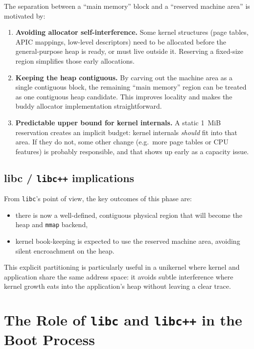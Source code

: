 \documentclass[a4paper,11pt]{article}
\begin{document}
The separation between a “main memory” block and a “reserved machine
area” is motivated by:

\begin{enumerate}
  \item \textbf{Avoiding allocator self-interference.}  
    Some kernel structures (page tables, APIC mappings, low-level
    descriptors) need to be allocated before the general-purpose heap is
    ready, or must live outside it. Reserving a fixed-size region
    simplifies those early allocations.

  \item \textbf{Keeping the heap contiguous.}  
    By carving out the machine area as a single contiguous block, the
    remaining “main memory” region can be treated as one contiguous heap
    candidate. This improves locality and makes the buddy allocator
    implementation straightforward.

  \item \textbf{Predictable upper bound for kernel internals.}  
    A static 1~MiB reservation creates an implicit budget: kernel
    internals \emph{should} fit into that area. If they do not, some
    other change (e.g.\ more page tables or CPU features) is probably
    responsible, and that shows up early as a capacity issue.
\end{enumerate}

\subsection{libc / \texorpdfstring{\texttt{libc++}}{libc++} implications}

From \texttt{libc}'s point of view, the key outcomes of this phase are:

\begin{itemize}
  \item there is now a well-defined, contiguous physical region that
        will become the heap and \texttt{mmap} backend,
  \item kernel book-keeping is expected to use the reserved machine area,
        avoiding silent encroachment on the heap.
\end{itemize}

This explicit partitioning is particularly useful in a unikernel where
kernel and application share the same address space: it avoids subtle
interference where kernel growth eats into the application's heap
without leaving a clear trace.

\section{The Role of \texorpdfstring{\texttt{libc}}{libc} and \texorpdfstring{\texttt{libc++}}{libc++} in the Boot Process}
\end{document}
